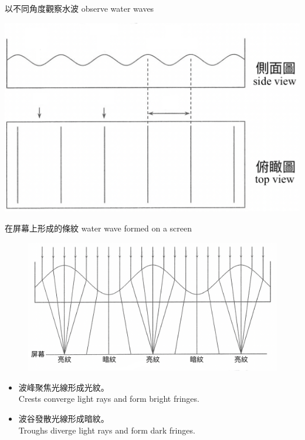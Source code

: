 \documentclass[beamer=true]{standalone}
\begin{document}
\begin{frame}{以不同角度觀察水波 observe water waves}


    \par{\par\centering\includegraphics[width=\textwidth]{./img/ch2_cf_2024-05-24-13-08-21.png}\par}
\end{frame}


\begin{frame}{在屏幕上形成的條紋 water wave formed on a screen}
    \begin{figure}
        \centering
        \includegraphics[width=0.75\linewidth]{images/Screenshot 2023-09-26 at 9.55.36 PM.png}
    \end{figure}
    \begin{itemize}
        \item 波峰聚焦光線形成光紋。\\Crests converge light rays and form bright fringes.
        \item 波谷發散光線形成暗紋。\\Troughs diverge  light rays and form dark fringes.
    \end{itemize}
\end{frame}
\end{document}
